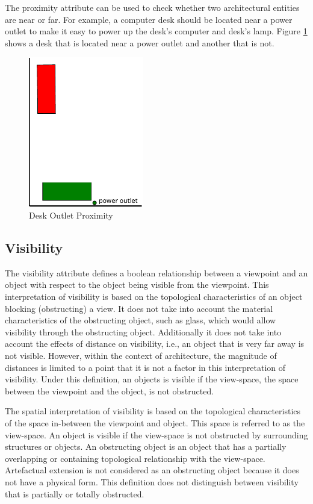 \documentclass[12pt]{ucthesis}
\begin{document}
The proximity attribute can be used to check whether two architectural entities are near or far. For example, a computer desk should be located near a power outlet to make it easy to power up the desk's computer and desk's lamp. Figure \ref{desk-proximity} shows a desk that is located near a power outlet and another that is not. %

\begin{figure}[H]
 \centering
 \includegraphics[width=50mm]{desk-proximity}
 \caption{Desk Outlet Proximity}
\label{desk-proximity}
\end{figure}

\subsection{Visibility}
The visibility attribute defines a boolean relationship between a viewpoint and an object with respect to the object being visible from the viewpoint. This interpretation of visibility is based on the topological characteristics of an object blocking (obstructing) a view. It does not take into account the material characteristics of the obstructing object, such as glass, which would allow visibility through the obstructing object. Additionally it does not take into account the effects of distance on visibility, i.e., an object that is very far away is not visible. However, within the context of architecture, the magnitude of distances is limited to a point that it is not a factor in this interpretation of visibility. Under this definition, an objects is visible if the view-space, the space between the viewpoint and the object, is not obstructed.

The spatial interpretation of visibility is based on the topological characteristics of the space in-between the viewpoint and object. This space is referred to as the view-space. An object is visible if the view-space is not obstructed by surrounding structures or objects. An obstructing object is an object that has a partially overlapping or containing topological relationship with the view-space. Artefactual extension is not considered as an obstructing object because it does not have a physical form. This definition does not distinguish between visibility that is partially or totally obstructed.
\end{document}
